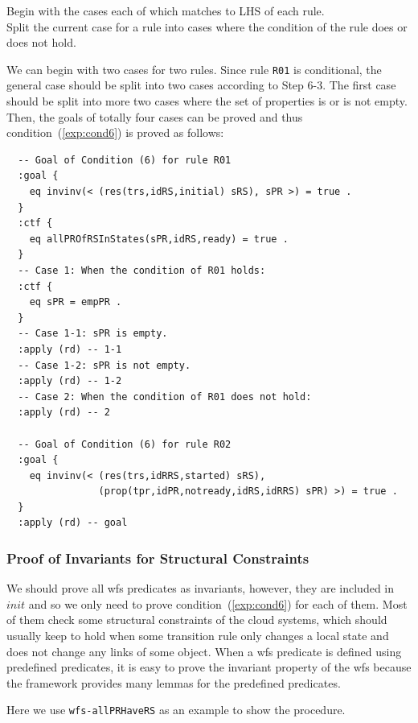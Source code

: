 \documentclass[12pt]{report}
\begin{document}
 Begin with the cases each of which matches to
LHS of each rule. \\ 
 Split the current case for a rule into
cases where the condition of the rule does or does not hold. 

We can begin with two cases for two rules. Since rule {\tt R01} is
conditional, the general case should be split into two cases according
to Step 6-3. The first case should be split into more two cases
where the set of properties is or is not empty.
Then, the goals of totally four cases can be proved and
thus condition~(\ref{exp:cond6}) is proved as follows:
\small
\begin{verbatim}
  -- Goal of Condition (6) for rule R01
  :goal {
    eq invinv(< (res(trs,idRS,initial) sRS), sPR >) = true .
  }
  :ctf {
    eq allPROfRSInStates(sPR,idRS,ready) = true .
  }
  -- Case 1: When the condition of R01 holds:
  :ctf {
    eq sPR = empPR .
  }
  -- Case 1-1: sPR is empty.
  :apply (rd) -- 1-1
  -- Case 1-2: sPR is not empty.
  :apply (rd) -- 1-2
  -- Case 2: When the condition of R01 does not hold:
  :apply (rd) -- 2

  -- Goal of Condition (6) for rule R02
  :goal {
    eq invinv(< (res(trs,idRRS,started) sRS),
                (prop(tpr,idPR,notready,idRS,idRRS) sPR) >) = true .
  }
  :apply (rd) -- goal
\end{verbatim}
\normalsize

\subsubsection*{Proof of Invariants for Structural Constraints}
We should prove all wfs predicates as invariants, however, they are
included in $init$ and so we only need to prove
condition~(\ref{exp:cond6}) for each of them. Most of them check some
structural constraints of the cloud systems, which should usually keep
to hold when some transition rule only changes a local state and
does not change any links of some
object. When a wfs predicate is defined using predefined predicates, it
is easy to prove the invariant property of the wfs because the framework
provides many lemmas for the predefined predicates.

Here we use {\tt wfs-allPRHaveRS} as an example to show the procedure.\\
\end{document}
